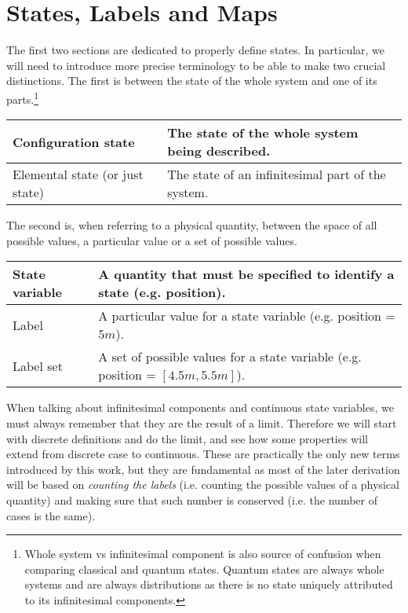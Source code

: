 \documentclass[aps,pra,10pt,twocolumn,floatfix,nofootinbib]{revtex4-1}
\theoremstyle{definition}
\begin{document}
\section{States, Labels and Maps}

The first two sections are dedicated to properly define states. In particular, we will need to introduce more precise terminology to be able to make two crucial distinctions. The first is between the state of the whole system and one of its parts.\footnote{Whole system vs infinitesimal component is also source of confusion when comparing classical and quantum states. Quantum states are always whole systems and are always distributions as there is no state uniquely attributed to its infinitesimal components.}
\begin{center}
    \begin{tabular}{ | p{2.5cm} | p{5.5cm} | }
    \hline
    Configuration state & The state of the whole system being described. \\ \hline
    Elemental state (or just state) & The state of an infinitesimal part of the system. \\ \hline
    \end{tabular}
\end{center}
The second is, when referring to a physical quantity, between the space of all possible values, a particular value or a set of possible values.
\begin{center}
    \begin{tabular}{ | p{2.5cm} | p{5.5cm} | }
    \hline
    State variable & A quantity that must be specified to identify a state (e.g. position). \\ \hline
    Label & A particular value for a state variable (e.g. position = $5m$). \\ \hline
    Label set & A set of possible values for a state variable (e.g. position = $[4.5m, 5.5m]$). \\
    \hline
    \end{tabular}
\end{center}
When talking about infinitesimal components and continuous state variables, we must always remember that they are the result of a limit. Therefore we will start with discrete definitions and do the limit, and see how some properties will extend from discrete case to continuous. These are practically the only new terms introduced by this work, but they are fundamental as most of the later derivation will be based on \emph{counting the labels} (i.e. counting the possible values of a physical quantity) and making sure that such number is conserved (i.e. the number of cases is the same).
\end{document}
